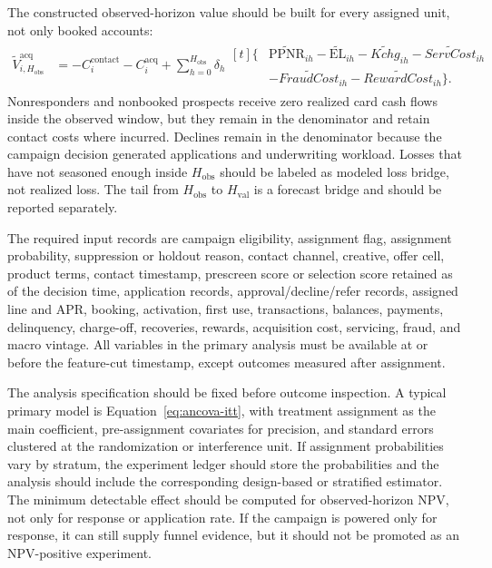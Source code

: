 \documentclass[11pt]{article}
\newcommand{\EL}{\mathrm{EL}}
\newcommand{\PPNR}{\mathrm{PPNR}}
\newcommand{\1}{\mathbf{1}}
\begin{document}
The constructed observed-horizon value should be built for every assigned
unit, not only booked accounts:
\begin{align}
  \widetilde{V}^{\mathrm{acq}}_{i,H_{\mathrm{obs}}}
  &=
  -C_i^{\mathrm{contact}}
  -C_i^{\mathrm{acq}}
  +\sum_{h=0}^{H_{\mathrm{obs}}}\delta_h
  \begin{aligned}[t]
  \{&
    \widetilde{\PPNR}_{ih}
    -\widetilde{\EL}_{ih}
    -\widetilde{Kchg}_{ih}
    -\widetilde{ServCost}_{ih} \\
    &-\widetilde{FraudCost}_{ih}
    -\widetilde{RewardCost}_{ih}\}.
  \end{aligned}
  \label{eq:worked-acq-observed-value}
\end{align}
Nonresponders and nonbooked prospects receive zero realized card cash flows
inside the observed window, but they remain in the denominator and retain
contact costs where incurred. Declines remain in the denominator because the
campaign decision generated applications and underwriting workload. Losses
that have not seasoned enough inside $H_{\mathrm{obs}}$ should be labeled as
modeled loss bridge, not realized loss. The tail from $H_{\mathrm{obs}}$ to
$H_{\mathrm{val}}$ is a forecast bridge and should be reported separately.

The required input records are campaign eligibility, assignment flag,
assignment probability, suppression or holdout reason, contact channel,
creative, offer cell, product terms, contact timestamp, prescreen score or
selection score retained as of the decision time, application records,
approval/decline/refer records, assigned line and APR, booking, activation,
first use, transactions, balances, payments, delinquency, charge-off,
recoveries, rewards, acquisition cost, servicing, fraud, and macro vintage.
All variables in the primary analysis must be available at or before the
feature-cut timestamp, except outcomes measured after assignment.

The analysis specification should be fixed before outcome inspection. A
typical primary model is Equation~\eqref{eq:ancova-itt}, with treatment
assignment as the main coefficient, pre-assignment covariates for precision,
and standard errors clustered at the randomization or interference unit. If
assignment probabilities vary by stratum, the experiment ledger should store
the probabilities and the analysis should include the corresponding
design-based or stratified estimator. The minimum detectable effect should be
computed for observed-horizon NPV, not only for response or application rate.
If the campaign is powered only for response, it can still supply funnel
evidence, but it should not be promoted as an NPV-positive experiment.
\end{document}
